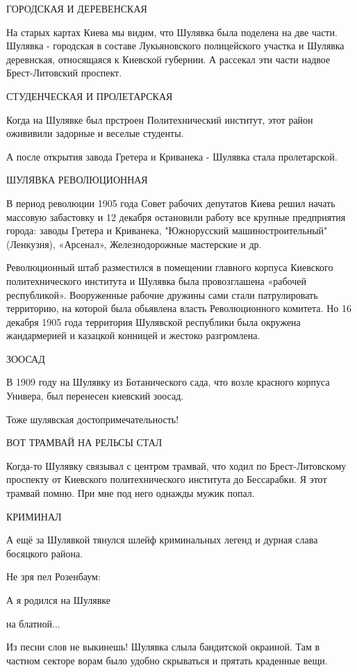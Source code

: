 ГОРОДСКАЯ И ДЕРЕВЕНСКАЯ

На старых картах Киева мы видим, что Шулявка была поделена на две части.
Шулявка - городская в составе Лукьяновского полицейского участка и Шулявка
деревнская, относящаяся к Киевской губернии. А рассекал эти части надвое
Брест-Литовский проспект.  

СТУДЕНЧЕСКАЯ И ПРОЛЕТАРСКАЯ

Когда на Шулявке был прстроен Политехнический институт, этот район ожививили
задорные и веселые студенты.

А после открытия завода Гретера и Криванека - Шулявка стала пролетарской.

ШУЛЯВКА РЕВОЛЮЦИОННАЯ

В период революции 1905 года Совет рабочих депутатов Киева решил начать
массовую забастовку и 12 декабря остановили работу все крупные предприятия
города: заводы Гретера и Криванека, "Южнорусский машиностроительный"(Ленкузня),
«Арсенал», Железнодорожные мастерские и др.

Революционный штаб разместился в помещении главного корпуса Киевского
политехнического института и Шулявка была провозглашена «рабочей республикой».
Вооруженные рабочие дружины сами стали патрулировать территорию, на которой
была обьявлена власть Революционного комитета. Но 16 декабря 1905 года
территория Шулявской республики была окружена  жандармерией и казацкой конницей
и жестоко разгромлена. 

ЗООСАД

В 1909 году на Шулявку из Ботанического сада, что возле красного корпуса
Универа, был перенесен киевский зоосад. 

Тоже шулявская достопримечательность!

ВОТ ТРАМВАЙ НА РЕЛЬСЫ СТАЛ

Когда-то Шулявку связывал с центром трамвай, что ходил по Брест-Литовскому
проспекту от Киевского политехнического института до Бессарабки. Я этот трамвай
помню. При мне под него однажды мужик попал.

КРИМИНАЛ

А ещё за Шулявкой тянулся шлейф криминальных легенд и дурная слава босяцкого района.

Не зря пел Розенбаум:

А я родился на Шулявке

на блатной...

Из песни слов не выкинешь! Шулявка слыла бандитской окраиной. Там в частном
секторе ворам было удобно скрываться и прятать краденные вещи.

